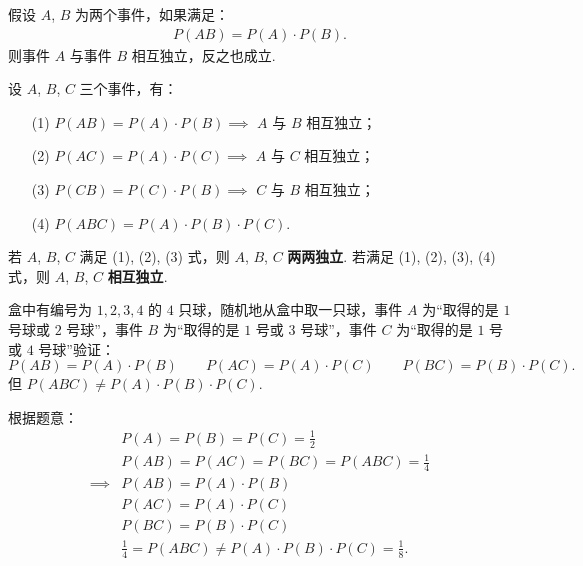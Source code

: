 \documentclass[12pt, a4paper, oneside, UTF8]{ctexbook}
\begin{document}
\begin{defn}
    假设 \(A\), \(B\) 为两个事件，如果满足：
    \begin{align*}
        P\left(AB\right) = P\left(A\right) \cdot P\left(B\right).
    \end{align*}
    则事件 \(A\) 与事件 \(B\) 相互独立，反之也成立.
\end{defn}

\begin{thm}
    设 \(A\), \(B\), \(C\) 三个事件，有：
    \begin{enumerate}
        \item[(1)] \(P\left(AB\right) = P\left(A\right) \cdot P\left(B\right) \implies\) \(A\) 与 \(B\) 相互独立；
        \item[(2)] \(P\left(AC\right) = P\left(A\right) \cdot P\left(C\right) \implies\) \(A\) 与 \(C\) 相互独立；
        \item[(3)] \(P\left(CB\right) = P\left(C\right) \cdot P\left(B\right) \implies\) \(C\) 与 \(B\) 相互独立；
        \item[(4)] \(P\left(ABC\right) = P\left(A\right) \cdot P\left(B\right) \cdot P\left(C\right)\).
    \end{enumerate}
    若 \(A\), \(B\), \(C\) 满足 (1), (2), (3) 式，则 \(A\), \(B\), \(C\) \textbf{两两独立}. 若满足 (1), (2), (3), (4) 式，则 \(A\), \(B\), \(C\) \textbf{相互独立}.
\end{thm}

\begin{example}
    盒中有编号为 \(1 , 2 , 3 , 4\) 的 \(4\) 只球，随机地从盒中取一只球，事件 \(A\) 为“取得的是 \(1\) 号球或 \(2\) 号球”，事件 \(B\) 为“取得的是 \(1\) 号或 \(3\) 号球”，事件 \(C\) 为“取得的是 \(1\) 号或 \(4\) 号球”验证：
    \[P\left(AB\right) = P\left(A\right)\cdot P\left(B\right)\qquad P\left(AC\right) = P\left(A\right)\cdot P\left(C\right)\qquad P\left(BC\right) = P\left(B\right)\cdot P\left(C\right).\]
    但 \(P\left(ABC\right) \neq P\left(A\right)\cdot P\left(B\right)\cdot P\left(C\right)\).
\end{example}

\begin{solution}
    根据题意：
    \begin{align*}
        &P\left(A\right) = P\left(B\right) = P\left(C\right) = \frac{1}{2}\\
        &P\left(AB\right) = P\left(AC\right) = P\left(BC\right) = P\left(ABC\right) = \frac{1}{4}\\ 
        \implies &P\left(AB\right) = P\left(A\right) \cdot P\left(B\right)\\ 
        &P\left(AC\right) = P\left(A\right)\cdot P\left(C\right)\\ 
        &P\left(BC\right) = P\left(B\right) \cdot P\left(C\right)\\ 
        &\frac{1}{4} = P\left(ABC\right) \neq P\left(A\right)\cdot P\left(B\right) \cdot P\left(C\right) = \frac{1}{8}.   
    \end{align*}
\end{solution}
\end{document}
